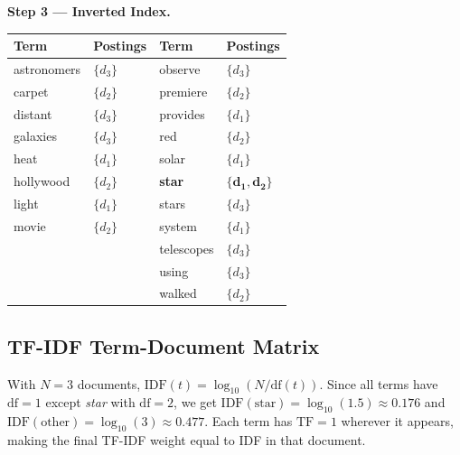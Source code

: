 \documentclass{article}
\begin{document}
\textbf{Step 3 — Inverted Index.}

\begin{center}
\renewcommand{\arraystretch}{1.15}
\begin{tabular}{ll|ll}
\toprule
\textbf{Term} & \textbf{Postings} & \textbf{Term} & \textbf{Postings} \\
\midrule
astronomers & $\{d_3\}$ & observe   & $\{d_3\}$ \\
carpet      & $\{d_2\}$ & premiere  & $\{d_2\}$ \\
distant     & $\{d_3\}$ & provides  & $\{d_1\}$ \\
galaxies    & $\{d_3\}$ & red       & $\{d_2\}$ \\
heat        & $\{d_1\}$ & solar     & $\{d_1\}$ \\
hollywood   & $\{d_2\}$ & \textbf{star} & $\mathbf{\{d_1, d_2\}}$ \\
light       & $\{d_1\}$ & stars     & $\{d_3\}$ \\
movie       & $\{d_2\}$ & system    & $\{d_1\}$ \\
&                       & telescopes& $\{d_3\}$ \\
&                       & using     & $\{d_3\}$ \\
&                       & walked    & $\{d_2\}$ \\
\bottomrule
\end{tabular}
\end{center}

\subsection{TF-IDF Term-Document Matrix}

With $N=3$ documents, $\mathrm{IDF}(t) = \log_{10}(N / \mathrm{df}(t))$. Since all terms have $\mathrm{df}=1$ except \textit{star} with $\mathrm{df}=2$, we get $\mathrm{IDF}(\text{star}) = \log_{10}(1.5) \approx 0.176$ and $\mathrm{IDF}(\text{other}) = \log_{10}(3) \approx 0.477$. Each term has $\mathrm{TF}=1$ wherever it appears, making the final TF-IDF weight equal to IDF in that document.
\end{document}
